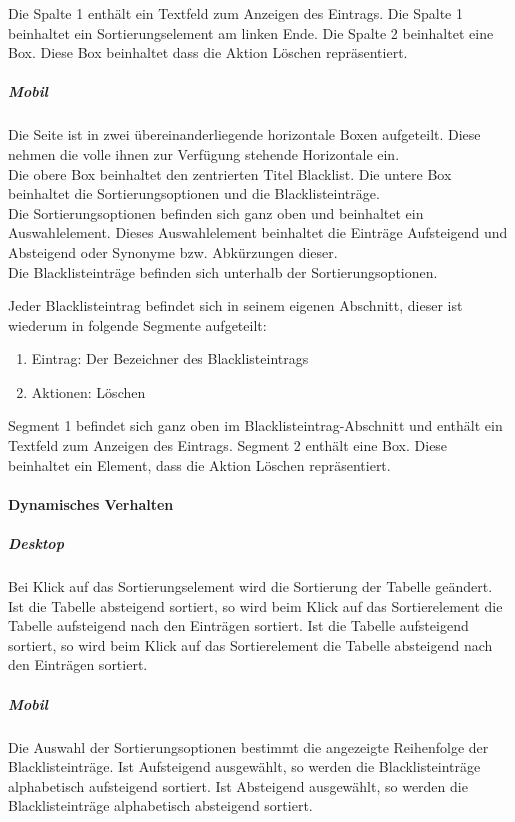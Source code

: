 Die Spalte 1 enthält ein Textfeld zum Anzeigen des Eintrags.
Die Spalte 1 beinhaltet ein Sortierungselement am linken Ende.
Die Spalte 2 beinhaltet eine Box. Diese Box beinhaltet dass die Aktion \dq Löschen \dq{} repräsentiert.

\subparagraph*{Mobil}
Die Seite ist in zwei übereinanderliegende horizontale Boxen aufgeteilt. Diese nehmen die volle ihnen zur Verfügung stehende Horizontale ein.\\
Die obere Box beinhaltet den zentrierten Titel \dq Blacklist\dq.
Die untere Box beinhaltet die Sortierungsoptionen und die Blacklisteinträge.\\
Die Sortierungsoptionen befinden sich ganz oben und beinhaltet ein Auswahlelement. 
Dieses Auswahlelement beinhaltet die Einträge \dq Aufsteigend \dq{} und \dq Absteigend \dq{} oder Synonyme bzw. Abkürzungen dieser.\\
Die Blacklisteinträge befinden sich unterhalb der Sortierungsoptionen.

Jeder Blacklisteintrag befindet sich in seinem eigenen Abschnitt, dieser ist wiederum in folgende Segmente aufgeteilt:

\begin{enumerate}
    \item Eintrag: Der Bezeichner des Blacklisteintrags
    \item Aktionen: Löschen
\end{enumerate}

Segment 1 befindet sich ganz oben im Blacklisteintrag-Abschnitt und enthält ein Textfeld zum Anzeigen des Eintrags.
Segment 2 enthält eine Box. Diese beinhaltet ein Element, dass die Aktion \dq Löschen \dq{} repräsentiert.

\paragraph*{Dynamisches Verhalten}
\subparagraph*{Desktop}
Bei Klick auf das Sortierungselement wird die Sortierung der Tabelle geändert.
Ist die Tabelle absteigend sortiert, so wird beim Klick auf das Sortierelement die Tabelle aufsteigend nach den Einträgen sortiert.
Ist die Tabelle aufsteigend sortiert, so wird beim Klick auf das Sortierelement die Tabelle absteigend nach den Einträgen sortiert.

\subparagraph*{Mobil}
Die Auswahl der Sortierungsoptionen bestimmt die angezeigte Reihenfolge der Blacklisteinträge.
Ist \dq Aufsteigend \dq{} ausgewählt, so werden die Blacklisteinträge alphabetisch aufsteigend sortiert.
Ist \dq Absteigend \dq{} ausgewählt, so werden die Blacklisteinträge alphabetisch absteigend sortiert.

